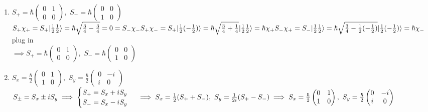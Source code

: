 \documentclass[12pt]{amsart}
\begin{document}
\begin{enumerate}
\item \underline{$S_+ = \hbar \begin{pmatrix} 0 &1 \\ 0 & 0 \end{pmatrix},\,\, S_- = \hbar \begin{pmatrix} 0& 0 \\ 1 & 0 \end{pmatrix}$}\\
$S_+ \chi_+ = S_+ | \frac{1}{2} \frac{1}{2} \rangle = \hbar \sqrt{ \frac{3}{4} - \frac{3}{4}} = 0 = S_- \chi_-\\
S_+ \chi_- = S_+ | \frac{1}{2} ( - \frac{1}{2}) \rangle = \hbar \sqrt{ \frac{3}{4} + \frac{1}{4}} | \frac{1}{2} \frac{1}{2} \rangle = \hbar \chi_+\\
S_- \chi_+ = S_- | \frac{1}{2} \frac{1}{2} \rangle = \hbar \sqrt{ \frac{3}{4} - \frac{1}{2} ( - \frac{1}{2})} | \frac{1}{2} ( - \frac{1}{2}) \rangle = \hbar \chi_-\\$
plug in\\
$\implies S_+ = \hbar \begin{pmatrix} 0 & 1 \\ 0 & 0 \end{pmatrix},\,\, S_- = \hbar \begin{pmatrix} 0 & 0 \\ 1 & 0 \end{pmatrix}$


\hdashrule[0.5ex][c]{\linewidth}{0.5pt}{1.5mm}


\item \underline{$S_x = \frac{\hbar}{2} \begin{pmatrix} 0 & 1 \\ 1 & 0 \end{pmatrix},\,\, S_y = \frac{\hbar}{2} \begin{pmatrix} 0 & - i \\ i & 0 \end{pmatrix}$}\\
$S_{\pm} = S_x \pm i S_y \implies \begin{cases} S_+ = S_x + i S_y \\ S_- = S_x - i S_y \end{cases}\\
\implies S_x = \frac{1}{2} ( S_+ + S_- ),\,\, S_y = \frac{1}{2i} ( S_+ - S_-)\\
\implies S_x = \frac{\hbar}{2} \begin{pmatrix} 0 &1 \\ 1 & 0 \end{pmatrix},\,\, S_y = \frac{\hbar}{2} \begin{pmatrix} 0 & - i \\ i & 0 \end{pmatrix}\\$



\end{enumerate}
\end{document}
